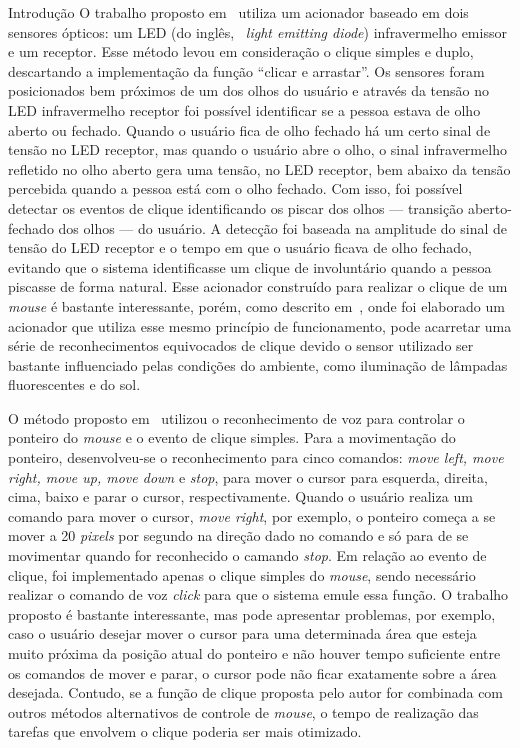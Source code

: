 \begin{chapter}{Introdução}
O trabalho proposto em~\cite{Skim10} utiliza um acionador baseado em dois
sensores ópticos: um LED (do inglês, ~\textit{light emitting diode})
infravermelho emissor e um receptor. Esse método levou em consideração o
clique simples e duplo, descartando a implementação da função ``clicar e
arrastar''. Os sensores foram posicionados bem próximos de um dos olhos do
usuário e através da tensão no LED infravermelho receptor foi possível
identificar se a pessoa estava de olho aberto ou fechado. Quando o usuário fica
de olho fechado há um certo sinal de tensão no LED receptor, mas quando o usuário
abre o olho, o sinal infravermelho refletido no olho aberto gera uma tensão, no
LED receptor, bem abaixo da tensão percebida quando a pessoa está com o olho
fechado. Com isso, foi possível detectar os eventos de clique identificando os
piscar dos olhos --- transição aberto-fechado dos olhos --- do usuário. A
detecção foi baseada na amplitude do sinal de tensão do LED receptor e o tempo
em que o usuário ficava de olho fechado, evitando que o sistema identificasse um
clique de involuntário quando a pessoa piscasse de forma natural. Esse acionador
construído para realizar o clique de um \textit{mouse} é bastante interessante,
porém, como descrito em~\cite{Batista17}, onde foi elaborado um acionador que
utiliza esse mesmo princípio de funcionamento, pode acarretar uma série de
reconhecimentos equivocados de clique devido o sensor utilizado ser bastante
influenciado pelas condições do ambiente, como iluminação de lâmpadas
fluorescentes e do sol.

O método proposto em~\cite{Karimullah02} utilizou o reconhecimento de voz para
controlar o ponteiro do \textit{mouse} e o evento de clique simples. Para a
movimentação do ponteiro, desenvolveu-se o reconhecimento para cinco comandos: \textit{move
left, move right, move up, move down} e \textit{stop}, para mover o cursor para
esquerda, direita, cima, baixo e parar o cursor, respectivamente. Quando o
usuário realiza um comando para mover o cursor, \textit{move right}, por 
exemplo, o ponteiro começa a se mover a 20 \textit{pixels} por segundo na
direção dado no comando e só para de se movimentar quando for reconhecido o
camando \textit{stop}. Em relação ao evento de clique, foi implementado apenas o
clique simples do \textit{mouse}, sendo necessário realizar o comando de voz 
\textit{click} para que o sistema emule essa função. O trabalho proposto é
bastante interessante, mas pode apresentar problemas, por exemplo, caso o usuário
desejar mover o cursor para uma determinada área que esteja muito próxima da
posição atual do ponteiro e não houver tempo suficiente entre os comandos de
mover e parar, o cursor pode não ficar exatamente sobre a área desejada.
Contudo, se a função de clique proposta pelo autor for combinada com outros
métodos alternativos de controle de \textit{mouse}, o tempo de realização das 
tarefas que envolvem o clique poderia ser mais otimizado.


\end{chapter}
